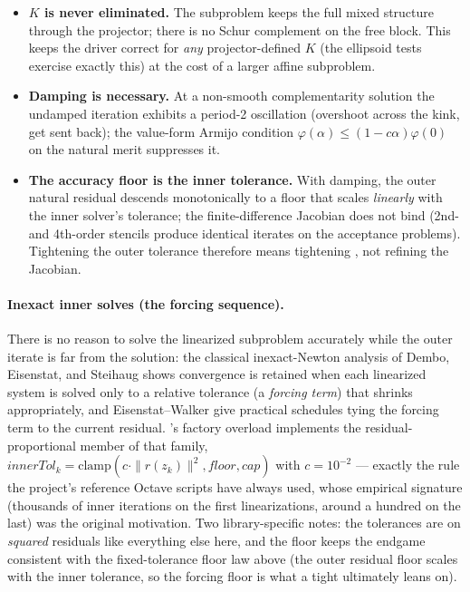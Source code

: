 \begin{itemize}
\item \textbf{$K$ is never eliminated.} The subproblem keeps the full mixed
  structure through the projector; there is no Schur complement on the free
  block. This keeps the driver correct for \emph{any} projector-defined
  $K$ (the ellipsoid tests exercise exactly this) at the cost of a larger
  affine subproblem.
\item \textbf{Damping is necessary.} At a non-smooth complementarity
  solution the undamped iteration exhibits a period-2 oscillation
  (overshoot across the kink, get sent back); the value-form Armijo
  condition $\varphi(\alpha) \le (1 - c\alpha)\varphi(0)$ on the natural
  merit suppresses it.
\item \textbf{The accuracy floor is the inner tolerance.} With damping, the
  outer natural residual descends monotonically to a floor that scales
  \emph{linearly} with the inner solver's tolerance; the finite-difference
  Jacobian does not bind (2nd- and 4th-order stencils produce identical
  iterates on the acceptance problems). Tightening the outer tolerance
  therefore means tightening , not refining the Jacobian.
\end{itemize}

\paragraph{Inexact inner solves (the forcing sequence).} There is no reason
to solve the linearized subproblem accurately while the outer iterate is
far from the solution: the classical inexact-Newton analysis of Dembo,
Eisenstat, and Steihaug \cite{dembo1982} shows convergence is retained when
each linearized system is solved only to a relative tolerance (a
\emph{forcing term}) that shrinks appropriately, and Eisenstat--Walker
\cite{eisenstat1996} give practical schedules tying the forcing term to the
current residual. 's factory overload implements the
residual-proportional member of that family,
$\mathit{innerTol}_k = \mathrm{clamp}(c \cdot \|r(z_k)\|^2,
\mathit{floor}, \mathit{cap})$ with $c = 10^{-2}$ --- exactly the
 rule the project's reference Octave scripts have
always used, whose empirical signature (thousands of inner iterations on
the first linearizations, around a hundred on the last) was the original
motivation. Two library-specific notes: the tolerances are on \emph{squared}
residuals like everything else here, and the floor keeps the endgame
consistent with the fixed-tolerance floor law above (the outer residual
floor scales with the inner tolerance, so the forcing floor is what a
tight  ultimately leans on).

